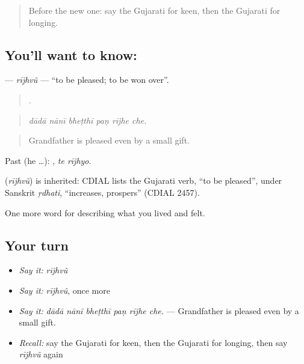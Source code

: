 \label{lesson:GU-C449-rijhvu}



\begin{quote}
Before the new one: say the Gujarati for keen, then the Gujarati for longing.
\end{quote}

\subsection*{You'll want to know: }
\textbf{} — \emph{rījhvũ} — \textquotedblleft{}to be pleased; to be won over\textquotedblright{}.

\begin{quote}
     .
\end{quote}

\begin{quote}
\emph{dādā nānī bheṭthī paṇ rījhe che.}
\end{quote}

\begin{quote}
Grandfather is pleased even by a small gift.
\end{quote}

Past (he …):  , \emph{te rījhyo}.

\begin{cousinweb}
\textbf{} (\emph{rījhvũ}) is inherited: CDIAL lists the Gujarati verb, \textquotedblleft{}to be pleased\textquotedblright{}, under Sanskrit \emph{ṛdhati}, \textquotedblleft{}increases, prospers\textquotedblright{} (CDIAL 2457).
\end{cousinweb}

\begin{grammarlens}[title={What you've built}]
One more word for describing what you lived and felt.
\end{grammarlens}

\subsection*{Your turn}
\begin{itemize}
\raggedright
  \item \emph{Say it:} \emph{rījhvũ}
  \item \emph{Say it:} \emph{rījhvũ}, once more
  \item \emph{Say it:} \emph{dādā nānī bheṭthī paṇ rījhe che.} — Grandfather is pleased even by a small gift.
  \item \emph{Recall:} say the Gujarati for keen, then the Gujarati for longing, then say \emph{rījhvũ} again
\end{itemize}

